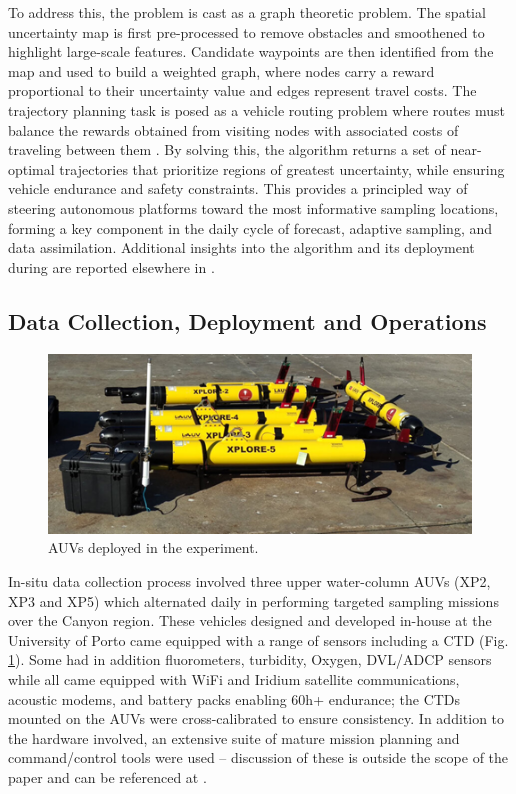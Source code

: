 To address this, the problem is cast as a graph theoretic problem. The
spatial uncertainty map is first pre-processed to remove obstacles and
smoothened to highlight large-scale features. Candidate waypoints are
then identified from the map and used to build a weighted graph, where
nodes carry a reward proportional to their uncertainty value and edges
represent travel costs. The trajectory planning task is posed as a
vehicle routing problem where routes must balance the rewards obtained
from visiting nodes with associated costs of traveling between them
\cite{vidal2013,toth2014vehicle}. By solving this, the algorithm
returns a set of near-optimal trajectories that prioritize regions of
greatest uncertainty, while ensuring vehicle endurance and safety
constraints. This provides a principled way of steering autonomous
platforms toward the most informative sampling locations, forming a
key component in the daily cycle of forecast, adaptive sampling, and
data assimilation. Additional insights into the algorithm and its
deployment during \proj are reported elsewhere in
\cite{bernacchi2025}.

\subsection{Data Collection, Deployment and Operations}


\begin{figure}
    \centering
    \includegraphics[width=.7\linewidth]{fig/lauvs.png}
    \caption{AUVs deployed in the \proj experiment.}
    \label{fig:lauvs}
\end{figure}

In-situ data collection process involved three upper water-column AUVs
(XP2, XP3 and XP5) which alternated daily in performing targeted
sampling missions over the \naz Canyon region. These vehicles designed
and developed in-house at the University of Porto \cite{sousa2012lauv}
came equipped with a range of sensors including a CTD
(Fig. \ref{fig:lauvs}). Some had in addition fluorometers, turbidity,
Oxygen, DVL/ADCP sensors while all came equipped with WiFi and Iridium
satellite communications, acoustic modems, and battery packs enabling
60h+ endurance; the CTDs mounted on the AUVs were cross-calibrated to
ensure consistency. In addition to the hardware involved, an extensive
suite of mature mission planning and command/control tools were used
-- discussion of these is outside the scope of the paper and can be
referenced at
\cite{dias2005neptus,seacons10,toolchain2012,pinto2013lsts,Ferreira2018}.

